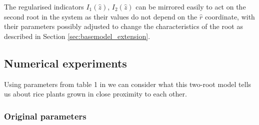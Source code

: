 \documentclass[11pt]{article}
\numberwithin{equation}{section}
\begin{document}
The regularised indicators $I_1(\hat z)$, $I_2(\hat z)$ can be mirrored easily to act on the second root in the system as their values do not depend on the $\hat r$ coordinate, with their parameters possibly adjusted to change the characteristics of the root as described in Section \ref{sec:basemodel_extension}.

\subsection{Numerical experiments}
Using parameters from table 1 in \cite{Ptashnyk-2011} we can consider what this two-root model tells us about rice plants grown in close proximity to each other.


\subsubsection{Original parameters}
\end{document}
